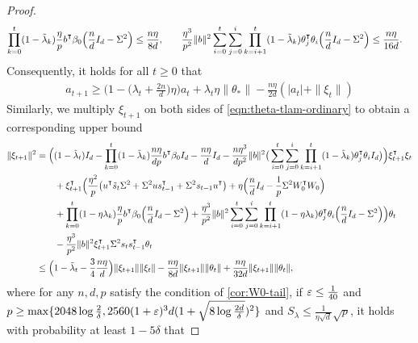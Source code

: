 \begin{proof}
\begin{align*}
         \prod_{k=0}^t (1-\tilde\lambda_k)\frac{\eta}{p}b\transpose\beta_0 \Big(\frac{n}{d}I_d - \Sigma^2\Big) \leq \frac{n\eta}{8d},& \qquad \frac{\eta^3}{p^2}\|b\|^2\sum_{i=0}^t\sum_{j=0}^i\prod_{k=i+1}^t(1-\tilde\lambda_k)\theta_j\transpose \theta_i \Big(\frac{n}{d}I_d-\Sigma^2\Big) \leq \frac{n\eta}{16d}.
    \end{align*}
    Consequently, it holds for all $t\geq 0$ that 
    \begin{align*}
        a_{t+1}\geq \Big(1-\Big(\lambda_t+\frac{2n}{d}\Big)\eta\Big)a_t+\lambda_t\eta\|\theta_*\| - \frac{n\eta}{2d} (|a_t| + \|\xi_t\|)
    \end{align*}
    Similarly, we multiply $\xi_{t+1}$ on both sides of \cref{eqn:theta-tlam-ordinary} to obtain a corresponding upper bound
    \begin{align}\label{eqn:xi_tlam-ordinary}
        \begin{split}
            \|\xi_{t+1}\|^2 & = \Big((1-\tlam_t)I_d -\prod_{k=0}^t(1-\tlam_k)\frac{n\eta}{dp}b\transpose\beta_0 I_d - \frac{n\eta}{d} I_d - \frac{n\eta^3}{dp^2}\|b\|^2\big(\sum_{i=0}^t\sum_{j=0}^i\prod_{k=i+1}^t(1-\tlam_k)\theta_j\transpose \theta_i I_d \big)\Big) \xi_{t+1}\transpose \xi_t \\
            & \qquad + \xi_{t+1}\transpose\Big(\frac{\eta^2}{p}\big(u\transpose \tilde{s}_t \Sigma^2 + \Sigma^2 u s_{t-1}\transpose + \Sigma^2 s_{t-1}u\transpose\big) + \eta\Big(\frac{n}{d}I_d - \frac{1}{p}\Sigma^2 W_0\transpose W_0\Big)  \\
            & \qquad + \prod_{k=0}^t(1-\eta\lambda_k)\frac{\eta}{p}b\transpose\beta_0 \Big(\frac{n}{d}I_d - \Sigma^2\Big) + \frac{\eta^3}{p^2}\|b\|^2\sum_{i=0}^t\sum_{j=0}^i\prod_{k=i+1}^t(1-\eta\lambda_k)\theta_j\transpose \theta_i \Big(\frac{n}{d}I_d-\Sigma^2\Big) \Big)\theta_t \\
            & \qquad -\frac{\eta^3}{p^2}\|b\|^2 \xi_{t+1}\transpose \Sigma^2 s_ts_{t-1}\transpose \theta_t \\
            & \leq \Big(1-\tlam_t-\frac{3}{4}\frac{n\eta}{d}\Big)\|\xi_{t+1}\| \|\xi_t\| - \frac{n\eta}{8d}\|\xi_{t+1}\|\|\theta_t\| + \frac{n\eta}{32d} \|\xi_{t+1}\|\|\theta_t\|,
        \end{split}
    \end{align}
    where for any $n,d,p$ satisfy the condition of \cref{cor:W0-tail}, if $\varepsilon\leq \frac{1}{40}$ and $p\geq \max\{2048\log\frac{2}{\delta},2560(1+\varepsilon)^3d(1+\sqrt{8\log\frac{2d}{\delta}})^2\}$ and $S_\lambda\leq \frac{1}{\eta\sqrt{d}}\sqrt{p}$, it holds with probability at least $1-5\delta$ that

\end{proof}
